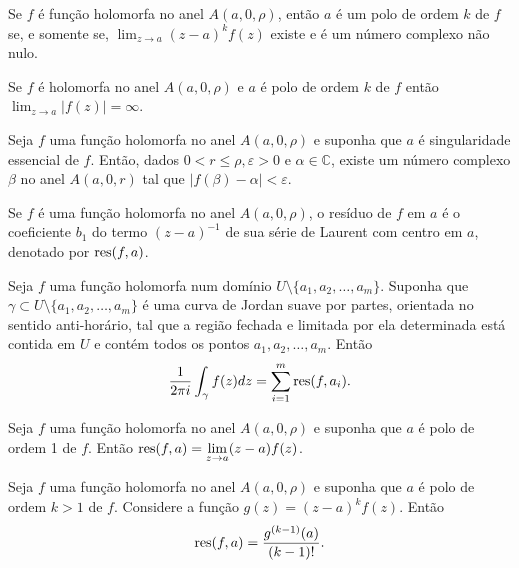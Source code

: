 \begin{proposicao}
Se $f$ é função holomorfa no anel $A(a, 0, \rho)$, então $a$ é um polo de ordem $k$ de $f$
se, e somente se, $\displaystyle{ \lim_{z\to a} (z-a)^k f(z) }$ existe e é um número complexo não nulo.
\end{proposicao}


\begin{corolario}
Se $f$ é holomorfa no anel $A(a, 0, \rho)$ e $a$ é polo de ordem $k$ de $f$ então
$\displaystyle{ \lim_{z\to a} |f(z)| = \infty }$.
\end{corolario}


\begin{teorema}
\label{teo-casorati-weierstrass}
Seja $f$ uma função holomorfa no anel $A(a,0,\rho)$ e suponha que $a$ é singularidade essencial de $f$.
Então, dados $0<r\leq\rho, \varepsilon > 0$ e $\alpha\in\mathbb{C}$, existe um número complexo $\beta$
no anel $A(a,0,r)$ tal que $|f(\beta) - \alpha| < \varepsilon$.
\end{teorema}


\begin{definicao}
Se $f$ é uma função holomorfa no anel $A(a, 0, \rho)$, o resíduo de $f$ em $a$ é o coeficiente $b_1$
do termo $(z-a)^{-1}$ de sua série de Laurent com centro em $a$, denotado por $\operatorname{res}(f, a)$.
\end{definicao}


\begin{teorema}
\label{teo-residuos}
Seja $f$ uma função holomorfa num domínio $U\setminus\{ a_1, a_2, \dots, a_m \}$. Suponha que 
$\gamma \subset U\setminus\{ a_1, a_2, \dots, a_m \}$ é uma curva de Jordan suave por partes,
orientada no sentido anti-horário, tal que a região fechada e limitada por ela determinada está
contida em $U$ e contém todos os pontos $ a_1, a_2, \dots, a_m$. Então
\begin{equation*}
    \frac{1}{2\pi i}\int_{\gamma} f(z) dz = \sum_{i=1}^m \operatorname{res}(f, a_i).
\end{equation*}
\end{teorema}


\begin{proposicao}
Seja $f$ uma função holomorfa no anel $A(a, 0, \rho)$ e suponha que $a$ é polo de ordem 1 de $f$.
Então $\operatorname{res}(f,a) = \displaystyle{ \lim_{z\to a} (z-a) f(z) }$.
\end{proposicao}


\begin{proposicao}
Seja $f$ uma função holomorfa no anel $A(a, 0, \rho)$ e suponha que $a$ é polo de ordem $k>1$ de $f$.
Considere a função $g(z) = (z-a)^k f(z)$. Então
\begin{equation*}
    \operatorname{res}(f, a) = \frac{g^{(k-1)}(a)}{(k-1)!}.
\end{equation*}
\end{proposicao}


